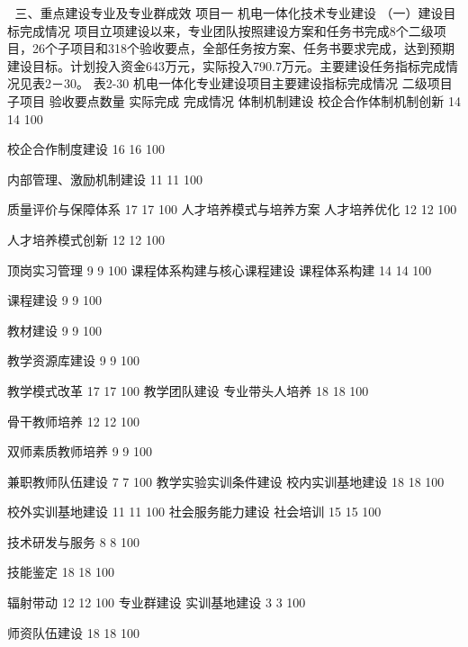 
三、重点建设专业及专业群成效
项目一   机电一体化技术专业建设
（一）建设目标完成情况
项目立项建设以来，专业团队按照建设方案和任务书完成8个二级项目，26个子项目和318个验收要点，全部任务按方案、任务书要求完成，达到预期建设目标。计划投入资金643万元，实际投入790.7万元。主要建设任务指标完成情况见表2－30。
表2-30  机电一体化专业建设项目主要建设指标完成情况
二级项目
子项目
验收要点数量
实际完成
完成情况
体制机制建设
校企合作体制机制创新
14
14
100%

校企合作制度建设
16
16
100%

内部管理、激励机制建设
11
11
100%

质量评价与保障体系
17
17
100%
人才培养模式与培养方案
人才培养优化
12
12
100%

人才培养模式创新
12
12
100%

顶岗实习管理
9
9
100%
课程体系构建与核心课程建设
课程体系构建
14
14
100%

课程建设
9
9
100%

教材建设
9
9
100%

教学资源库建设
9
9
100%

教学模式改革
17
17
100%
教学团队建设
专业带头人培养
18
18
100%

骨干教师培养
12
12
100%

双师素质教师培养
9
9
100%

兼职教师队伍建设
7
7
100%
教学实验实训条件建设
校内实训基地建设
18
18
100%

校外实训基地建设
11
11
100%
社会服务能力建设
社会培训
15
15
100%

技术研发与服务
8
8
100%

技能鉴定
18
18
100%

辐射带动
12
12
100%
专业群建设
实训基地建设
3
3
100%

师资队伍建设
18
18
100%

